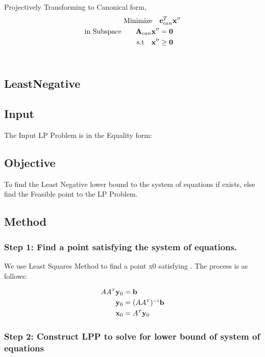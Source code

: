 \documentclass{report}
\begin{document}
Projectively Transforming to Canonical form,
\begin{align*}
	\text{Minimize\quad  }&  \mathbf c_{can}^T \mathbf x''\\
	\text{in  Subspace\quad } \quad\mathbf A_{can}\mathbf x''  &= \mathbf 0\\
	\text{s.t\quad } 	 \mathbf x'' &\ge \mathbf 0
\end{align*}
\\



\vspace{1cm}

\pagebreak


\pagebreak


\subsection{LeastNegative}

\subsection*{Input}
The Input LP Problem is in the Equality form:
\EqLP

\subsection*{Objective}
To find the Least Negative lower bound to the system of equations {\Axb} if exists, else find the Feasible point to the LP Problem.

\subsection*{Method}

\subsubsection*{Step 1: Find a  point satisfying the system of equations.}

We use Least Squares Method to find a point \vei x0 satisfying \Axb. The process is as follows:

\begin{align*}
	A A^{\scriptscriptstyle T}  \mathbf y_{0} &= \mathbf b \\
	\mathbf y_{0} &=  \mathbf (A A^{\scriptscriptstyle T} )^{\scriptscriptstyle {-1}} \mathbf b \\
	\mathbf x_{0} &=  A^{\scriptscriptstyle T}  \mathbf y_{0}
\end{align*}


\subsubsection*{Step 2: Construct LPP to solve for lower bound of system of equations}
\end{document}
